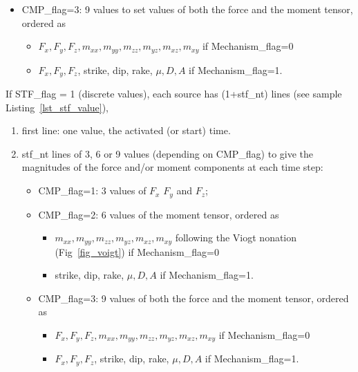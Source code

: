 \begin{itemize}
\begin{enumerate}
\begin{itemize}
\begin{itemize}
                        \end{itemize}
                    \item CMP\_flag=3: 9 values to set values of both the force and the moment tensor, ordered as 
                        \begin{itemize}
                            \item $F_x,F_y,F_z,m_{xx},m_{yy},m_{zz},m_{yz},m_{xz},m_{xy}$ if Mechanism\_flag=0
                            \item $F_x,F_y,F_z$, strike, dip, rake, $\mu, D, A$ if Mechanism\_flag=1.
                        \end{itemize}
                \end{itemize}
        \end{enumerate}

        If STF\_flag = 1 (discrete values), each source has (1+stf\_nt) lines (see sample Listing~\ref{lst_stf_value}),
        \begin{enumerate}
            \item first line: one value, the activated (or start) time.
            \item stf\_nt lines of 3, 6 or 9 values (depending on CMP\_flag) to give the magnitudes of the force and/or moment components at each time step:
                \begin{itemize}
                    \item CMP\_flag=1: 3 values of $F_x$ $F_y$ and $F_z$;
                    \item CMP\_flag=2: 6 values of the moment tensor, ordered as 
                        \begin{itemize}
                            \item $m_{xx},m_{yy},m_{zz},m_{yz},m_{xz},m_{xy}$ following the 
                                  Viogt nonation (Fig~\ref{fig_voigt}) if Mechanism\_flag=0
                            \item strike, dip, rake, $\mu, D, A$ if Mechanism\_flag=1.
                        \end{itemize}
                    \item CMP\_flag=3: 9 values of both the force and the moment tensor, ordered as 
                        \begin{itemize}
                            \item $F_x,F_y,F_z,m_{xx},m_{yy},m_{zz},m_{yz},m_{xz},m_{xy}$ if Mechanism\_flag=0
                            \item $F_x,F_y,F_z$, strike, dip, rake, $\mu, D, A$ if Mechanism\_flag=1.
                        \end{itemize}
                \end{itemize}
        \end{enumerate}
\end{itemize}


